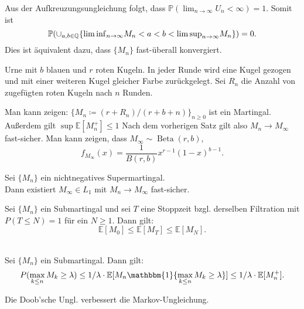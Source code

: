 \documentclass{cheat-sheet}
\renewcommand{\P}{\mathbb{P}} %
\newcommand{\E}{\mathbb{E}} %
\newcommand{\ind}{\mathbbm{1}} %
\DeclareMathOperator{\Beta}{Beta} %
\begin{document}
\begin{beweisskizze}
  Aus der Aufkreuzungsungleichung folgt, dass $\P({\lim}_{n \to \infty} U_n < \infty) = 1$.
  Somit ist
  \[ \P({\cup}_{a, b \in \Q} \{ {\liminf}_{n \to \infty} M_n < a < b < {\limsup}_{n \to \infty} M_n \}) = 0. \]
  Dies ist äquivalent dazu, dass $\{ M_n \}$ fast-überall konvergiert.
\end{beweisskizze}

\begin{bsp}
  Urne mit $b$ blauen und $r$ roten Kugeln.
  In jeder Runde wird eine Kugel gezogen und mit einer weiteren Kugel gleicher Farbe zurückgelegt.
  Sei $R_n$ die Anzahl von zugefügten roten Kugeln nach $n$ Runden.

  Man kann zeigen: $\{ M_n \coloneqq (r + R_n) / (r + b + n) \}_{n \geq 0}$ ist ein Martingal.
  Außerdem gilt $\sup \E[M_n^{+}] \leq 1$
  Nach dem vorherigen Satz gilt also $M_n \to M_\infty$ fast-sicher.
  Man kann zeigen, dass $M_\infty \sim \Beta(r, b)$,
  \[
    f_{M_\infty}(x) = \frac{1}{B(r, b)} x^{r-1} (1-x)^{b-1}.
  \]
\end{bsp}

\begin{kor}
  Sei $\{ M_n \}$ ein nichtnegatives Supermartingal. \\
  Dann existiert $M_\infty \in L_1$ mit $M_n \to M_\infty$ fast-sicher.
\end{kor}



\begin{satz}
  Sei $\{ M_n \}$ ein Submartingal und sei $T$ eine Stoppzeit bzgl. derselben Filtration mit $P(T \leq N) = 1$ für ein $N \geq 1$.
  Dann gilt:
  \[
    \E[M_0] \leq \E[M_T] \leq \E[M_N].
  \]
\end{satz}

\begin{satz} \mbox{}\\
  Sei $\{ M_n \}$ ein Submartingal.
  Dann gilt:
  \[
    P(\max_{k \leq n} M_k \geq \lambda) \leq 1/\lambda \cdot \E[ M_n \ind \{ \max_{k \leq n} M_k \geq \lambda \}] \leq 1/\lambda \cdot \E[ M_n^{+} ].
  \]
\end{satz}

\begin{bem}
  Die Doob'sche Ungl. verbessert die Markov-Ungleichung.
\end{bem}
\end{document}
